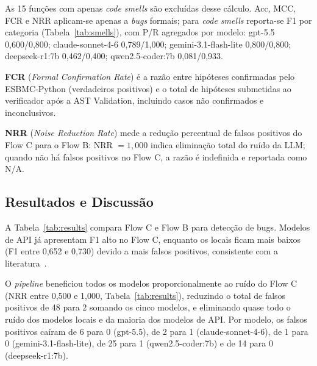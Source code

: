 \documentclass[sigconf]{acmart}
\begin{document}

As 15 funções com apenas \textit{code
smells} são excluídas desse cálculo. Acc, MCC, FCR e NRR aplicam-se
apenas a \textit{bugs} formais; para \textit{code smells} reporta-se F1 por categoria (Tabela~\ref{tab:smells}), com P/R agregados por modelo: gpt-5.5 0,600/0,800; claude-sonnet-4-6 0,789/1,000; gemini-3.1-flash-lite 0,800/0,800; deepseek-r1:7b 0,462/0,400; qwen2.5-coder:7b 0,081/0,933.


\textbf{FCR} (\textit{Formal Confirmation Rate}) é a razão entre
hipóteses confirmadas pelo ESBMC-Python (verdadeiros positivos) e o total de
hipóteses submetidas ao verificador após a AST Validation, incluindo
casos não confirmados e inconclusivos.


\textbf{NRR}
(\textit{Noise Reduction Rate}) mede a redução percentual de falsos
positivos do Flow C para o Flow B: NRR $=1{,}000$ indica eliminação total
do ruído da LLM; quando não há falsos positivos no Flow C, a razão é
indefinida e reportada como N/A.




\subsection{Resultados e Discussão}
\label{sec:resultados}

A Tabela~\ref{tab:results} compara Flow C e Flow B para detecção de bugs. Modelos de API já apresentam F1 alto no Flow C, enquanto os locais ficam mais baixos (F1 entre 0,652 e 0,730) devido a mais falsos positivos, consistente com a literatura~\cite{ding2025primevul}.

O \textit{pipeline} beneficiou todos os modelos proporcionalmente ao ruído do Flow C (NRR entre 0,500 e 1,000, Tabela~\ref{tab:results}), reduzindo o total de falsos positivos de 48 para 2 somando os cinco modelos, e eliminando quase todo o ruído dos modelos locais e da maioria dos modelos de API. Por modelo, os falsos positivos caíram de 6 para 0 (gpt-5.5), de 2 para 1 (claude-sonnet-4-6), de 1 para 0 (gemini-3.1-flash-lite), de 25 para 1 (qwen2.5-coder:7b) e de 14 para 0 (deepseek-r1:7b).
\end{document}
